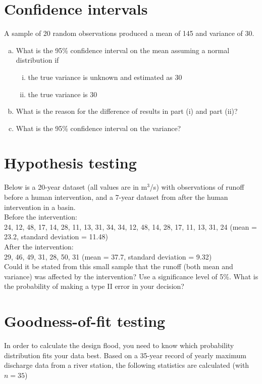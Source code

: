 \documentclass[12pt]{article}
\begin{document}
\section{Confidence intervals}
A sample of 20 random observations produced a mean of 145 and variance of 30. 
\begin{enumerate}[(a)] 
    \item What is the 95\% confidence interval on the mean assuming a normal distribution if 
    \begin{enumerate}[(i)] 
        \item the true variance is unknown and estimated as 30
        \item the true variance is 30
     \end{enumerate}
    \item What is the reason for the difference of results in part (i) and part (ii)?
    \item What is the 95\% confidence interval on the variance?
\end{enumerate}



\section{Hypothesis testing}
Below is a 20-year dataset (all values are in m$^3$/s) with observations of runoff before a human intervention, and a 7-year dataset from after the human intervention in a basin. \\

Before the intervention:\\
24, 12, 48, 17, 14, 28, 11, 13, 31, 34, 34, 12, 48, 14, 28, 17, 11, 13, 31, 24 (mean = 23.2, standard deviation = 11.48)\\

After the intervention:\\
29, 46, 49, 31, 28, 50, 31 (mean = 37.7, standard deviation = 9.32)\\


Could it be stated from this small sample that the runoff (both mean and variance) was affected by the intervention? Use a significance level of 5\%. What is the probability of making a type II error in your decision?




\section{Goodness-of-fit testing}
In order to calculate the design flood, you need to know which probability distribution fits your data best. Based on a 35-year record of yearly maximum discharge data from a river station, the following statistics are calculated (with $n = 35$)
\end{document}

